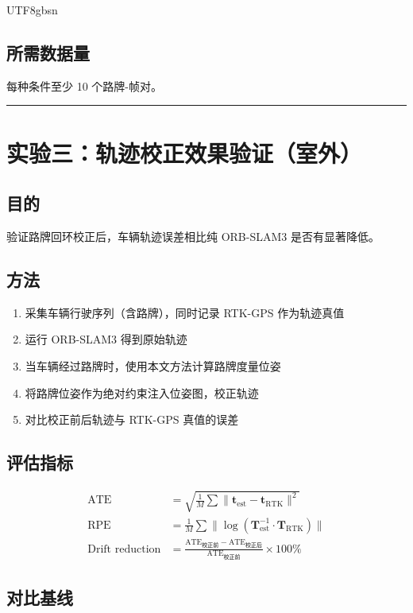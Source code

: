 \documentclass{article}
\begin{document}
\begin{CJK}{UTF8}{gbsn}
\subsection{所需数据量}
每种条件至少 10 个路牌-帧对。

\vspace{0.5cm}
\hrule

\section{实验三：轨迹校正效果验证（室外）}

\subsection{目的}
验证路牌回环校正后，车辆轨迹误差相比纯 ORB-SLAM3 是否有显著降低。

\subsection{方法}

\begin{enumerate}
    \item 采集车辆行驶序列（含路牌），同时记录 RTK-GPS 作为轨迹真值
    \item 运行 ORB-SLAM3 得到原始轨迹
    \item 当车辆经过路牌时，使用本文方法计算路牌度量位姿
    \item 将路牌位姿作为绝对约束注入位姿图，校正轨迹
    \item 对比校正前后轨迹与 RTK-GPS 真值的误差
\end{enumerate}

\subsection{评估指标}

\begin{align*}
\text{ATE} &= \sqrt{\frac{1}{M}\sum \| \mathbf{t}_{\text{est}} - \mathbf{t}_{\text{RTK}} \|^2} \\
\text{RPE} &= \frac{1}{M}\sum \| \log(\mathbf{T}_{\text{est}}^{-1} \cdot \mathbf{T}_{\text{RTK}}) \| \\
\text{Drift reduction} &= \frac{\text{ATE}_{\text{校正前}} - \text{ATE}_{\text{校正后}}}{\text{ATE}_{\text{校正前}}} \times 100\%
\end{align*}

\subsection{对比基线}


\end{CJK}
\end{document}
